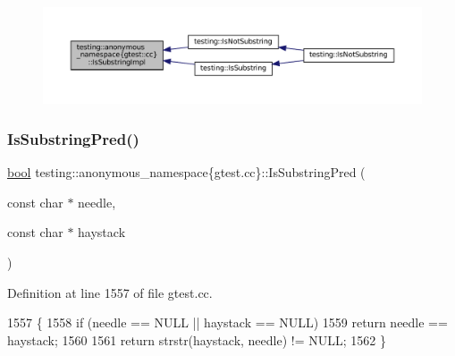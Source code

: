 \nopagebreak
\begin{figure}[H]
\begin{center}
\leavevmode
\includegraphics[width=350pt]{namespacetesting_1_1anonymous__namespace_02gtest_8cc_03_a0e1cb1e2b03a87a9c893322e4caab670_icgraph}
\end{center}
\end{figure}
\mbox{\label{namespacetesting_1_1anonymous__namespace_02gtest_8cc_03_aa8f2626915e70ad4d628f8fb247e0b6b}} 
\subsubsection{\texorpdfstring{Is\+Substring\+Pred()}{IsSubstringPred()}\hspace{0.1cm}{\footnotesize\ttfamily [1/3]}}
{\footnotesize\ttfamily \hyperlink{classbool}{bool} testing\+::anonymous\+\_\+namespace\{gtest.\+cc\}\+::Is\+Substring\+Pred (\begin{DoxyParamCaption}\item[{const char $\ast$}]{needle,  }\item[{const char $\ast$}]{haystack }\end{DoxyParamCaption})}



Definition at line 1557 of file gtest.\+cc.


\begin{DoxyCode}
1557                                                                \{
1558   \textcolor{keywordflow}{if} (needle == NULL || haystack == NULL)
1559     \textcolor{keywordflow}{return} needle == haystack;
1560 
1561   \textcolor{keywordflow}{return} strstr(haystack, needle) != NULL;
1562 \}
\end{DoxyCode}
\mbox{\label{namespacetesting_1_1anonymous__namespace_02gtest_8cc_03_ab0b38787cae43f83ad170e8d3260f425}} 

